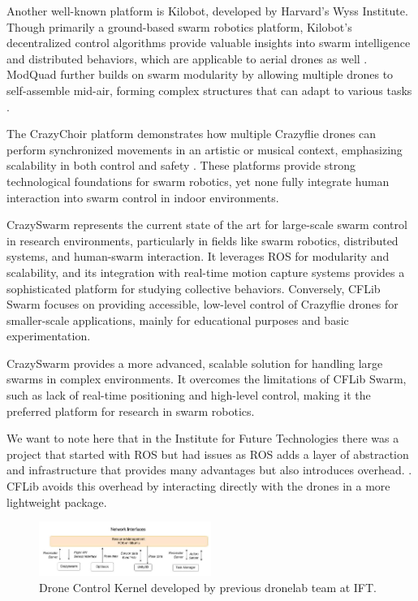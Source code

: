 Another well-known platform is Kilobot, developed by Harvard’s Wyss Institute. Though primarily a ground-based swarm robotics platform, Kilobot’s decentralized control algorithms provide valuable insights into swarm intelligence and distributed behaviors, which are applicable to aerial drones as well \cite{kilobot}. ModQuad further builds on swarm modularity by allowing multiple drones to self-assemble mid-air, forming complex structures that can adapt to various tasks \cite{modquad}.

The CrazyChoir platform demonstrates how multiple Crazyflie drones can perform synchronized movements in an artistic or musical context, emphasizing scalability in both control and safety \cite{crazychoir}. These platforms provide strong technological foundations for swarm robotics, yet none fully integrate human interaction into swarm control in indoor environments.

CrazySwarm \cite{preiss2017crazyswarm} represents the current state of the art for large-scale swarm control in research environments, particularly in fields like swarm robotics, distributed systems, and human-swarm interaction. It leverages \gls{ROS} for modularity and scalability, and its integration with real-time motion capture systems provides a sophisticated platform for studying collective behaviors. Conversely, CFLib Swarm focuses on providing accessible, low-level control of Crazyflie drones for smaller-scale applications, mainly for educational purposes and basic experimentation.

CrazySwarm provides a more advanced, scalable solution for handling large swarms in complex environments. It overcomes the limitations of CFLib \cite{bitcraze_cflib} Swarm, such as lack of real-time positioning and high-level control, making it the preferred platform for research in swarm robotics.

We want to note here that in the Institute for Future Technologies there was a project that started with \gls{ROS} but had issues as \gls{ROS} adds a layer of abstraction and infrastructure that provides many advantages but also introduces overhead. \cite{carstens_intelligent_nodate}. CFLib avoids this overhead by interacting directly with the drones in a more lightweight package.

\begin{figure}[htbp]
    \centerline{\includegraphics[width=0.5\textwidth]{images/ROSnetwork.png}}
    \caption{Drone Control Kernel developed by previous dronelab team at IFT.\cite{carstens_intelligent_nodate}}
    \label{fig}
    \end{figure} 

